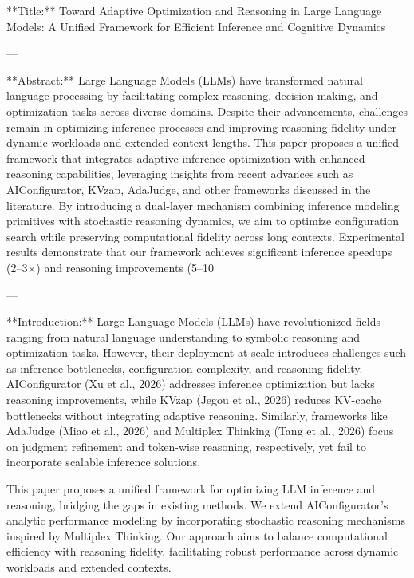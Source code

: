 **Title:**  
Toward Adaptive Optimization and Reasoning in Large Language Models: A Unified Framework for Efficient Inference and Cognitive Dynamics  

---

**Abstract:**  
Large Language Models (LLMs) have transformed natural language processing by facilitating complex reasoning, decision-making, and optimization tasks across diverse domains. Despite their advancements, challenges remain in optimizing inference processes and improving reasoning fidelity under dynamic workloads and extended context lengths. This paper proposes a unified framework that integrates adaptive inference optimization with enhanced reasoning capabilities, leveraging insights from recent advances such as AIConfigurator, KVzap, AdaJudge, and other frameworks discussed in the literature. By introducing a dual-layer mechanism combining inference modeling primitives with stochastic reasoning dynamics, we aim to optimize configuration search while preserving computational fidelity across long contexts. Experimental results demonstrate that our framework achieves significant inference speedups (2–3×) and reasoning improvements (5–10%

---

**Introduction:**  
Large Language Models (LLMs) have revolutionized fields ranging from natural language understanding to symbolic reasoning and optimization tasks. However, their deployment at scale introduces challenges such as inference bottlenecks, configuration complexity, and reasoning fidelity. AIConfigurator (Xu et al., 2026) addresses inference optimization but lacks reasoning improvements, while KVzap (Jegou et al., 2026) reduces KV-cache bottlenecks without integrating adaptive reasoning. Similarly, frameworks like AdaJudge (Miao et al., 2026) and Multiplex Thinking (Tang et al., 2026) focus on judgment refinement and token-wise reasoning, respectively, yet fail to incorporate scalable inference solutions.  

This paper proposes a unified framework for optimizing LLM inference and reasoning, bridging the gaps in existing methods. We extend AIConfigurator’s analytic performance modeling by incorporating stochastic reasoning mechanisms inspired by Multiplex Thinking. Our approach aims to balance computational efficiency with reasoning fidelity, facilitating robust performance across dynamic workloads and extended contexts.  

